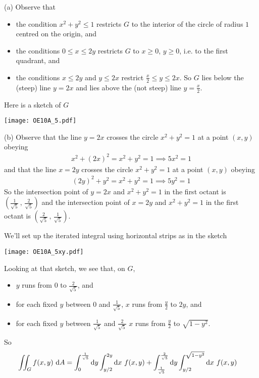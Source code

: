 \begin{solution}
(a) Observe that
\begin{itemize}
\item
the condition $x^2+y^2\le 1$ restricts $G$ to the interior of the 
circle of radius $1$ centred on the origin, and
\item
the conditions $0\le x\le 2y$ restricts $G$ to $x\ge 0$, $y\ge 0$,
i.e. to the first quadrant, and
\item
the conditions $x\le 2y$ and $y\le 2x$ restrict $\frac{x}{2}\le y\le 2x$.
So $G$ lies below the (steep) line $y=2x$ and lies above the (not steep)
line $y=\frac{x}{2}$. 
\end{itemize}
Here is a sketch of $G$

\begin{center}
     \texttt{[image: OE10A\_5.pdf]}
\end{center}

(b) Observe that the line $y=2x$ crosses the circle $x^2+y^2=1$ at
a point $(x,y)$ obeying
\begin{align*}
x^2+(2x)^2=x^2+y^2=1
\implies 5x^2=1
\end{align*}
and that the line $x=2y$ crosses the circle $x^2+y^2=1$ at
a point $(x,y)$ obeying
\begin{align*}
(2y)^2+y^2=x^2+y^2=1
\implies 5y^2=1
\end{align*}
So the intersection point of $y=2x$ and $x^2+y^2=1$ in the first octant
is $\left(\frac{1}{\sqrt{5}}\,,\,\frac{2}{\sqrt{5}}\right)$ and 
the intersection point of $x=2y$ and $x^2+y^2=1$ in the first octant
is $\left(\frac{2}{\sqrt{5}}\,,\,\frac{1}{\sqrt{5}}\right)$.

We'll set up the iterated integral using horizontal strips as in the
sketch
\begin{center}
     \texttt{[image: OE10A\_5xy.pdf]}
\end{center}

Looking at that sketch, we see that, on $G$,
\begin{itemize}
\item
$y$ runs from $0$ to $\frac{2}{\sqrt{5}}$, and
\item
for each fixed $y$ between $0$ and $\frac{1}{\sqrt{5}}$,
$x$ runs from $\frac{y}{2}$ to $2y$, and
\item
for each fixed $y$ between $\frac{1}{\sqrt{5}}$ and $\frac{2}{\sqrt{5}}$
$x$ runs from $\frac{y}{2}$ to $\sqrt{1-y^2}$.
\end{itemize}
So
\begin{align*}
\iint_G f(x,y)\ \mathrm{d}A
&=\int_0^{\frac{1}{\sqrt{5}}}\mathrm{d}y\int_{y/2}^{2y}\mathrm{d}x\ f(x,y)
 +\int_{\frac{1}{\sqrt{5}}}^{\frac{2}{\sqrt{5}}}\mathrm{d}y\int_{y/2}^{\sqrt{1-y^2}}
         \mathrm{d}x\ f(x,y)
\end{align*}


\end{solution}

